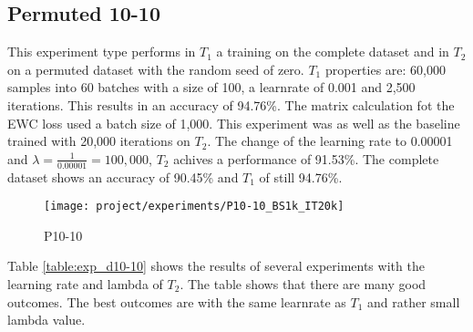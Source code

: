 \newpage

\subsection{Permuted 10-10}

This experiment type performs in $T_1$ a training on the complete dataset and in $T_2$ on a permuted dataset with the random seed of zero.
\newline
$T_1$ properties are: 60,000 samples into 60 batches with a size of 100, a learnrate of 0.001 and 2,500 iterations.
This results in an accuracy of 94.76\%.
The matrix calculation fot the EWC loss used a batch size of 1,000.
\newline
This experiment was as well as the baseline trained with 20,000 iterations on $T_2$.
The change of the learning rate to 0.00001 and $\lambda = \frac{1}{0.00001} = 100,000$, $T_2$ achives a performance of 91.53\%.
The complete dataset shows an accuracy of 90.45\% and $T_1$ of still 94.76\%.

\begin{figure}[H]
    \centering
    \texttt{[image: project/experiments/P10-10\_BS1k\_IT20k]}
    \caption{P10-10}
    \label{fig:exp_p10-10}
\end{figure}

\newpage

Table \ref{table:exp_d10-10} shows the results of several experiments with the learning rate and lambda of $T_2$.
The table shows that there are many good outcomes.
The best outcomes are with the same learnrate as $T_1$ and rather small lambda value.

